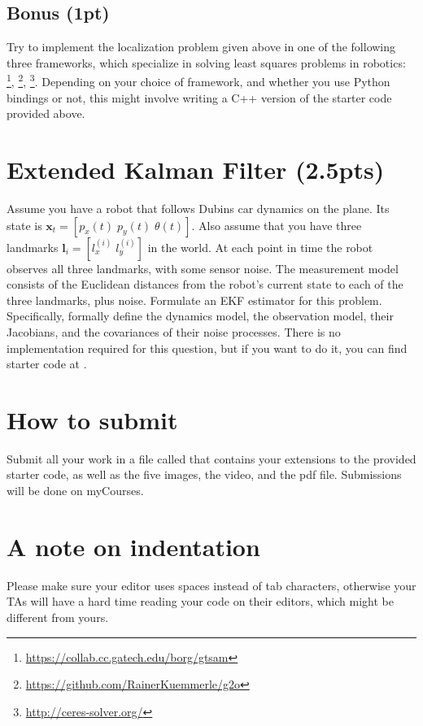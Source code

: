 \documentclass[a4paper,10pt]{article}
\begin{document}
\subsection{Bonus (1pt)}
Try to implement the localization problem given above in one of the following three frameworks, which specialize in solving least squares
problems in robotics: \footnote{\url{https://collab.cc.gatech.edu/borg/gtsam}}, \footnote{\url{https://github.com/RainerKuemmerle/g2o}}, \footnote{\url{http://ceres-solver.org/}}. 
Depending on your choice of framework, and whether you use Python bindings or not, this might involve writing a C++ version of the starter code provided above.


\section{Extended Kalman Filter (2.5pts)}
Assume you have a robot that follows Dubins car dynamics on the plane. Its state is $\textbf{x}_t=[p_x(t) \; p_y(t) \; \theta(t)]$. Also assume that you have
three landmarks $\textbf{l}_i=[l_x^{(i)} \; l_y^{(i)}]$ in the world. At each point in time the robot observes all three landmarks, with some sensor noise.
The measurement model consists of the Euclidean distances from the robot's current state to each of the three landmarks, plus noise. Formulate an EKF estimator for this problem.
Specifically, formally define the dynamics model, the observation model, their Jacobians, and the covariances of their noise processes. There is no implementation
required for this question, but if you want to do it, you can find starter code at . 

\section{How to submit}
Submit all your work in a file called  that contains your extensions to the provided starter code, as well as the five images, the video, and the pdf file. 
Submissions will be done on myCourses. 

\section{A note on indentation}
Please make sure your editor uses spaces instead of tab characters, otherwise your TAs will have a hard time reading your code on their editors, which might be different from yours.
\end{document}
